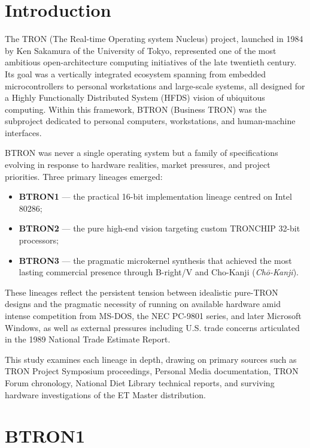 \documentclass{article}
\begin{document}
\tableofcontents
\newpage

\section{Introduction}

The TRON (The Real-time Operating system Nucleus) project, launched in 1984 by Ken Sakamura of the University of Tokyo, represented one of the most ambitious open-architecture computing initiatives of the late twentieth century. Its goal was a vertically integrated ecosystem spanning from embedded microcontrollers to personal workstations and large-scale systems, all designed for a Highly Functionally Distributed System (HFDS) vision of ubiquitous computing. Within this framework, BTRON (Business TRON) was the subproject dedicated to personal computers, workstations, and human-machine interfaces.

BTRON was never a single operating system but a family of specifications evolving in response to hardware realities, market pressures, and project priorities. Three primary lineages emerged:

\begin{itemize}
  \item \textbf{BTRON1} --- the practical 16-bit implementation lineage centred on Intel 80286;
  \item \textbf{BTRON2} --- the pure high-end vision targeting custom TRONCHIP 32-bit processors;
  \item \textbf{BTRON3} --- the pragmatic microkernel synthesis that achieved the most lasting commercial presence through B-right/V and Cho-Kanji (\textit{Ch\=o-Kanji}).
\end{itemize}

These lineages reflect the persistent tension between idealistic pure-TRON designs and the pragmatic necessity of running on available hardware amid intense competition from MS-DOS, the NEC PC-9801 series, and later Microsoft Windows, as well as external pressures including U.S. trade concerns articulated in the 1989 National Trade Estimate Report.

This study examines each lineage in depth, drawing on primary sources such as TRON Project Symposium proceedings, Personal Media documentation, TRON Forum chronology, National Diet Library technical reports, and surviving hardware investigations of the ET Master distribution.

\section{BTRON1}
\end{document}
